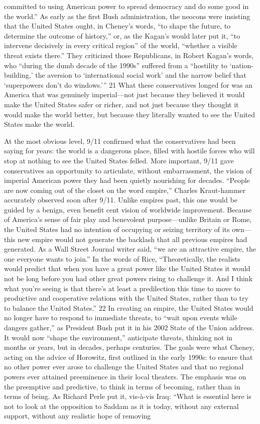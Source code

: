 committed to using American power to spread democracy and do some good in the world.” As early as the first Bush administration, the neocons were insisting that the United States ought, in Cheney’s words, “to shape the future, to determine the outcome of history,” or, as the Kagan's would later put it, “to intervene decisively in every critical region” of the world, “whether a visible threat exists there.” They criticized those Republicans, in Robert Kagan’s words, who “during the dumb decade of the 1990s” suffered from a “hostility to ‘nation-building,’ the aversion to ‘international social work’ and the narrow belief that ‘superpowers don’t do windows.’” {\color{blue} 21 } What these conservatives longed for was an America that was genuinely imperial—not just because they believed it would make the United States safer or richer, and not just because they thought it would make the world better, but because they literally wanted to see the United States make the world.{\par} At the most obvious level, 9/11 confirmed what the conservatives had been saying for years: the world is a dangerous place, filled with hostile forces who will stop at nothing to see the United States felled. More important, 9/11 gave conservatives an opportunity to articulate, without embarrassment, the vision of imperial American power they had been quietly nourishing for decades. “People are now coming out of the closet on the word empire,” Charles Kraut-hammer accurately observed soon after 9/11. Unlike empires past, this one would be guided by a benign, even benefit cent vision of worldwide improvement. Because of America’s sense of fair play and benevolent purpose—unlike Britain or Rome, the United States had no intention of occupying or seizing territory of its own—this new empire would not generate the backlash that all previous empires had generated. As a Wall Street Journal writer said, “we are an attractive empire, the one everyone wants to join.” In the words of Rice, “Theoretically, the realists would predict that when you have a great power like the United States it would not be long before you had other great powers rising to challenge it. And I think what you’re seeing is that there’s at least a predilection this time to move to productive and cooperative relations with the United States, rather than to try to balance the United States.” {\color{blue} 22 } In creating an empire, the United States would no longer have to respond to immediate threats, to “wait upon events while dangers gather,” as President Bush put it in his 2002 State of the Union address. It would now “shape the environment,” anticipate threats, thinking not in months or years, but in decades, perhaps centuries. The goals were what Cheney, acting on the advice of Horowitz, first outlined in the early 1990s: to ensure that no other power ever arose to challenge the United States and that no regional powers ever attained preeminence in their local theaters. The emphasis was on the preemptive and predictive, to think in terms of becoming, rather than in terms of being. As Richard Perle put it, vis-à-vis Iraq: “What is essential here is not to look at the opposition to Saddam as it is today, without any external support, without any realistic hope of removing 